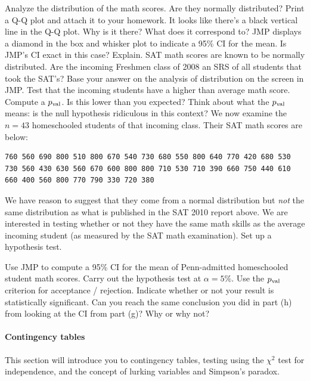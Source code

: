 \documentclass[12pt]{article}
\begin{document}
\benum
\easysubproblem Analyze the distribution of the math scores. Are they normally distributed? Print a Q-Q plot and attach it to your homework.
\easysubproblem It looks like there's a black vertical line in the Q-Q plot. Why is it there? What does it correspond to?
\hardsubproblem JMP displays a diamond in the box and whisker plot to indicate a 95\% CI for the mean. Is JMP's CI exact in this case? Explain.
\easysubproblem SAT math scores are known to be normally distributed. Are the incoming Freshmen class of 2008 an SRS of all students that took the SAT's? Base your answer on the analysis of distribution on the screen in JMP.
\intermediatesubproblem Test that the incoming students have a higher than average math score. Compute a $p_{\text{val}}$. Is this lower than you expected? Think about what the $p_{\text{val}}$ means: is the null hypothesis ridiculous in this context?
\easysubproblem We now examine the $n=43$ homeschooled students of that incoming class. Their SAT math scores are below:

\begin{verbatim}
760 560 690 800 510 800 670 540 730 680 550 800 640 770 420 680 530 
730 560 430 630 560 670 600 800 800 710 530 710 390 660 750 440 610 
660 400 560 800 770 790 330 720 380
\end{verbatim}

We have reason to suggest that they come from a normal distribution but \textit{not} the same distribution as what is published in the SAT 2010 report above. We are interested in testing whether or not they have the same math skills as the average incoming student (as measured by the SAT math examination). Set up a hypothesis test.

\easysubproblem Use JMP to compute a 95\% CI for the mean of Penn-admitted homeschooled student math scores. 
\intermediatesubproblem Carry out the hypothesis test at $\alpha = 5\%$. Use the $p_{\text{val}}$ criterion for acceptance / rejection. Indicate whether or not your result is statistically significant.
\easysubproblem Can you reach the same conclusion you did in part (h) from looking at the CI from part (g)? Why or why not?
\eenum



\paragraph{Contingency tables} This section will introduce you to contingency tables, testing using the $\chi^2$ test for independence, and the concept of lurking variables and Simpson's paradox. \\
\end{document}
